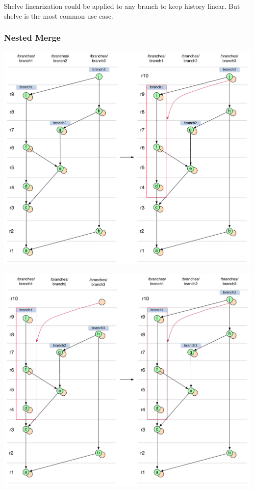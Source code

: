 Shelve linearization could be applied to any branch to keep history linear. But shelve is the most common use case.

\subsubsection{Nested Merge}

\begin{center}
\includegraphics[width=\textwidth]{img/diagrams/merge_sequence_git_to_svn.pdf}%
\label{merge_sequence_git_to_svn}%
\end{center}

\begin{center}
\includegraphics[width=\textwidth]{img/diagrams/merge_sequence_svn_to_git.pdf}%
\label{merge_sequence_svn_to_git}%
\end{center}

